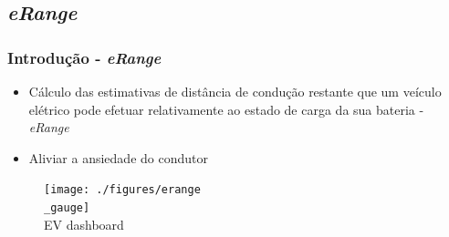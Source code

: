 \documentclass{beamer}
\begin{document}

\subsection[\textit{eRange}]{\textit{eRange}}
\begin{frame}
\frametitle{Introdução - \textit{eRange}}

\begin{itemize}
	\item Cálculo das estimativas de distância de condução restante 
	que um veículo elétrico pode efetuar relativamente ao estado de 
	carga da sua bateria - \textit{eRange}
	\item Aliviar a ansiedade do condutor
\end{itemize}

\begin{figure}[H]
    \begin{center}
        \texttt{[image: ./figures/erange\\\_gauge]}
		{\\EV dashboard }
    \end{center}
\end{figure}
\end{frame}
\end{document}
